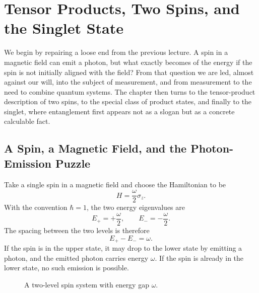 \chapter{Tensor Products, Two Spins, and the Singlet State}

We begin by repairing a loose end from the previous lecture. A spin in a magnetic field can emit a photon, but what exactly becomes of the energy if the spin is not initially aligned with the field? From that question we are led, almost against our will, into the subject of measurement, and from measurement to the need to combine quantum systems. The chapter then turns to the tensor-product description of two spins, to the special class of product states, and finally to the singlet, where entanglement first appears not as a slogan but as a concrete calculable fact.

\section{A Spin, a Magnetic Field, and the Photon-Emission Puzzle}

Take a single spin in a magnetic field and choose the Hamiltonian to be
\begin{equation}
H=\frac{\omega}{2}\sigma_z.
\end{equation}
With the convention \(\hbar=1\), the two energy eigenvalues are
\begin{equation}
E_+=+\frac{\omega}{2},
\qquad
E_-=-\frac{\omega}{2}.
\end{equation}
The spacing between the two levels is therefore
\begin{equation}
E_+-E_-=\omega.
\end{equation}
If the spin is in the upper state, it may drop to the lower state by emitting a photon, and the emitted photon carries energy \(\omega\). If the spin is already in the lower state, no such emission is possible.

\begin{figure}[ht]
\centering
{}
\caption{A two-level spin system with energy gap \(\omega\).}
\end{figure}

